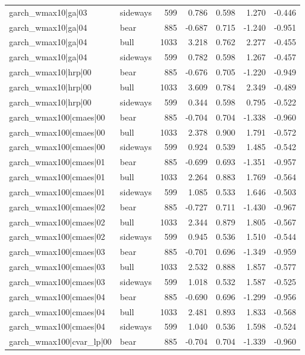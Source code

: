 \begin{table}
\begin{tabular}{llrrrrr}
garch\_wmax10|ga|03 & sideways & 599 & 0.786 & 0.598 & 1.270 & -0.446 \\
garch\_wmax10|ga|04 & bear & 885 & -0.687 & 0.715 & -1.240 & -0.951 \\
garch\_wmax10|ga|04 & bull & 1033 & 3.218 & 0.762 & 2.277 & -0.455 \\
garch\_wmax10|ga|04 & sideways & 599 & 0.782 & 0.598 & 1.267 & -0.457 \\
garch\_wmax10|hrp|00 & bear & 885 & -0.676 & 0.705 & -1.220 & -0.949 \\
garch\_wmax10|hrp|00 & bull & 1033 & 3.609 & 0.784 & 2.349 & -0.489 \\
garch\_wmax10|hrp|00 & sideways & 599 & 0.344 & 0.598 & 0.795 & -0.522 \\
garch\_wmax100|cmaes|00 & bear & 885 & -0.704 & 0.704 & -1.338 & -0.960 \\
garch\_wmax100|cmaes|00 & bull & 1033 & 2.378 & 0.900 & 1.791 & -0.572 \\
garch\_wmax100|cmaes|00 & sideways & 599 & 0.924 & 0.539 & 1.485 & -0.542 \\
garch\_wmax100|cmaes|01 & bear & 885 & -0.699 & 0.693 & -1.351 & -0.957 \\
garch\_wmax100|cmaes|01 & bull & 1033 & 2.264 & 0.883 & 1.769 & -0.564 \\
garch\_wmax100|cmaes|01 & sideways & 599 & 1.085 & 0.533 & 1.646 & -0.503 \\
garch\_wmax100|cmaes|02 & bear & 885 & -0.727 & 0.711 & -1.430 & -0.967 \\
garch\_wmax100|cmaes|02 & bull & 1033 & 2.344 & 0.879 & 1.805 & -0.567 \\
garch\_wmax100|cmaes|02 & sideways & 599 & 0.945 & 0.536 & 1.510 & -0.544 \\
garch\_wmax100|cmaes|03 & bear & 885 & -0.701 & 0.696 & -1.349 & -0.959 \\
garch\_wmax100|cmaes|03 & bull & 1033 & 2.532 & 0.888 & 1.857 & -0.577 \\
garch\_wmax100|cmaes|03 & sideways & 599 & 1.018 & 0.532 & 1.587 & -0.525 \\
garch\_wmax100|cmaes|04 & bear & 885 & -0.690 & 0.696 & -1.299 & -0.956 \\
garch\_wmax100|cmaes|04 & bull & 1033 & 2.481 & 0.893 & 1.833 & -0.568 \\
garch\_wmax100|cmaes|04 & sideways & 599 & 1.040 & 0.536 & 1.598 & -0.524 \\
garch\_wmax100|cvar\_lp|00 & bear & 885 & -0.704 & 0.704 & -1.339 & -0.960 \\

\end{tabular}
\end{table}
